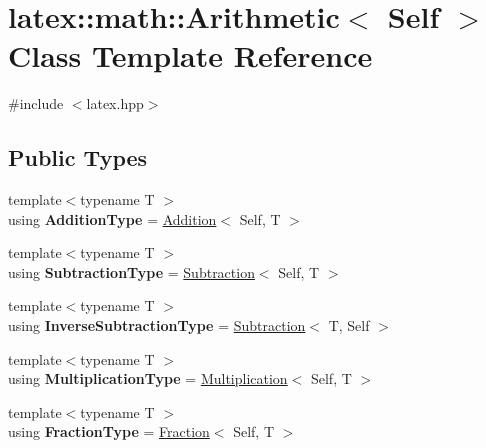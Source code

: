 \hypertarget{classlatex_1_1math_1_1Arithmetic}{\section{latex\-:\-:math\-:\-:Arithmetic$<$ Self $>$ Class Template Reference}
\label{classlatex_1_1math_1_1Arithmetic}
}


{\ttfamily \#include $<$latex.\-hpp$>$}

\subsection*{Public Types}
\begin{DoxyCompactItemize}
\item 
\hypertarget{classlatex_1_1math_1_1Arithmetic_a33d9ffed366ea87e7c32df497e0b9d32}{{\footnotesize template$<$typename T $>$ }\\using {\bfseries Addition\-Type} = \hyperlink{classlatex_1_1math_1_1Addition}{Addition}$<$ Self, T $>$}\label{classlatex_1_1math_1_1Arithmetic_a33d9ffed366ea87e7c32df497e0b9d32}

\item 
\hypertarget{classlatex_1_1math_1_1Arithmetic_a9a49c562d2e384aaec7b6e0f52932eac}{{\footnotesize template$<$typename T $>$ }\\using {\bfseries Subtraction\-Type} = \hyperlink{classlatex_1_1math_1_1Subtraction}{Subtraction}$<$ Self, T $>$}\label{classlatex_1_1math_1_1Arithmetic_a9a49c562d2e384aaec7b6e0f52932eac}

\item 
\hypertarget{classlatex_1_1math_1_1Arithmetic_a269e55722b37c6660801cf23fec615e5}{{\footnotesize template$<$typename T $>$ }\\using {\bfseries Inverse\-Subtraction\-Type} = \hyperlink{classlatex_1_1math_1_1Subtraction}{Subtraction}$<$ T, Self $>$}\label{classlatex_1_1math_1_1Arithmetic_a269e55722b37c6660801cf23fec615e5}

\item 
\hypertarget{classlatex_1_1math_1_1Arithmetic_a554373e2a106a04eb060a15141d0cac9}{{\footnotesize template$<$typename T $>$ }\\using {\bfseries Multiplication\-Type} = \hyperlink{classlatex_1_1math_1_1Multiplication}{Multiplication}$<$ Self, T $>$}\label{classlatex_1_1math_1_1Arithmetic_a554373e2a106a04eb060a15141d0cac9}

\item 
\hypertarget{classlatex_1_1math_1_1Arithmetic_a55d6e6be63edc6fea45195fe953ab902}{{\footnotesize template$<$typename T $>$ }\\using {\bfseries Fraction\-Type} = \hyperlink{classlatex_1_1math_1_1Fraction}{Fraction}$<$ Self, T $>$}\label{classlatex_1_1math_1_1Arithmetic_a55d6e6be63edc6fea45195fe953ab902}


\end{DoxyCompactItemize}
